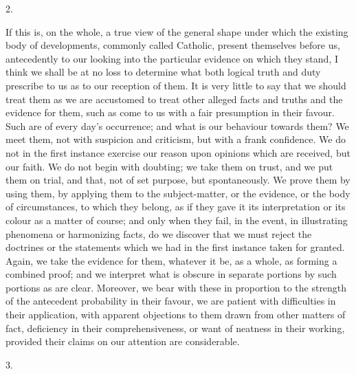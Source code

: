 2.

If this is, on the whole, a true view of the general
shape under which the existing body of developments,
commonly called Catholic, present themselves before us,
antecedently to our looking into the particular evidence
on which they stand, I think we shall be at no loss to
determine what both logical truth and duty prescribe to
us as to our reception of them. It is very little to say
that we should treat them as we are accustomed to treat
other alleged facts and truths and the evidence for them,
such as come to us with a fair presumption in their
favour. Such are of every day's occurrence; and what is
our behaviour towards them? We meet them, not with
suspicion and criticism, but with a frank confidence. We
do not in the first instance exercise our reason upon
opinions which are received, but our faith. We do not
begin with doubting; we take them on trust, and we put
them on trial, and that, not of set purpose, but
spontaneously. We prove them by using them, by applying
them to the subject-matter, or the evidence, or the body
of circumstances, to which they belong, as if they gave
it its interpretation or its colour as a matter of
course; and only when they fail, in the event, in
illustrating phenomena or harmonizing facts, do we
discover that we must reject the doctrines or the
statements which we had in the first instance taken for
granted. Again, we take the evidence for them, whatever
it be, as a whole, as forming a combined proof; and we
interpret what is obscure in separate portions by such
portions as are clear. Moreover, we bear with these in
proportion to the strength of the antecedent probability
in their favour, we are patient with difficulties in
their application, with apparent objections to them drawn
from other matters of fact, deficiency in their
comprehensiveness, or want of neatness in their working,
provided their claims on our attention are considerable.

3.

